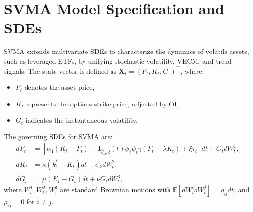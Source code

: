 \documentclass[12pt]{report}
\begin{document}
\section{SVMA Model Specification and SDEs}

SVMA extends multivariate SDEs to characterize the dynamics of volatile assets, such as leveraged ETFs, by unifying stochastic volatility, VECM, and trend signals. The state vector is defined as \(\mathbf{X}_t = (F_t, K_t, G_t)^\top\), where:
\begin{itemize}\setlength{\itemsep}{0pt}\setlength{\parskip}{4pt}
    \item \(F_t\) denotes the asset price,
    \item \(K_t\) represents the options strike price, adjusted by OI,
    \item \(G_t\) indicates the instantaneous volatility.
\end{itemize}

The governing SDEs for SVMA are:
\begin{align}
    dF_t &= \left[ \alpha_1 (K_t - F_t) + \mathbf{1}_{\hat{\theta}_\omega, \delta}(t) \phi_t \psi_t \gamma (F_t - \lambda K_t) + \xi \tau_t \right] dt + G_t dW_t^1, \label{eq:df_t} \\[4pt]
    dK_t &= \kappa (k_t^* - K_t) dt + \sigma_k dW_t^2, \label{eq:dk_t} \\[4pt]
    dG_t &= \mu (K_t - G_t) dt + \nu G_t dW_t^3, \label{eq:dg_t}
\end{align}
where \(W_t^1, W_t^2, W_t^3\) are standard Brownian motions with \(\mathbb{E}[dW_t^i dW_t^j] = \rho_{ij} dt\), and \(\rho_{ij} = 0\) for \(i \neq j\).

\vspace{0.2in}
\end{document}
